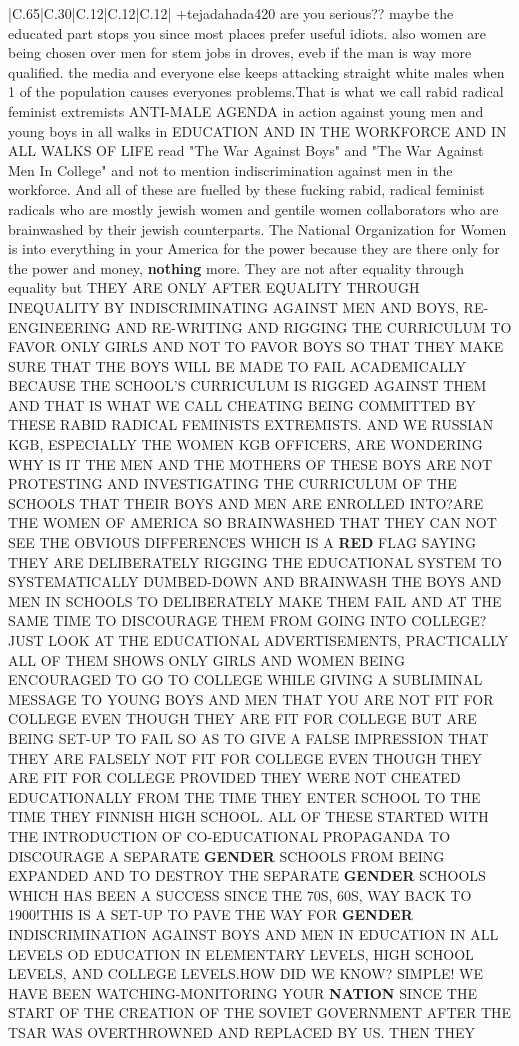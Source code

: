\documentclass[11pt]{article}
\newlength\mylength
\begin{document}
\begin{center}
\begin{longtable}{|C{.65\mylength}|C{.30\mylength}|C{.12\mylength}|C{.12\mylength}|C{.12\mylength}|}
  \small +tejadahada420 are you serious?? maybe the educated part stops you since most places prefer useful idiots. also women are being chosen over men for stem jobs in droves, eveb if the man is way more qualified. the media and everyone else keeps attacking straight white males when 1 of the population causes everyones problems.That is what we call rabid radical feminist extremists ANTI-MALE AGENDA in action against young men and young boys in all walks in EDUCATION AND IN THE WORKFORCE AND IN ALL WALKS OF LIFE read "The War Against Boys" and "The War Against Men In College" and not to mention indiscrimination against men in the workforce. And all of these are fuelled by these fucking rabid, radical feminist radicals who are mostly jewish women and gentile women collaborators who are brainwashed by their jewish counterparts. The National Organization for Women is into everything in your America for the power because they are there only for the power and money, \textbf{nothing} more. They are not after equality through equality but THEY ARE ONLY AFTER EQUALITY THROUGH INEQUALITY BY INDISCRIMINATING AGAINST MEN AND BOYS, RE-ENGINEERING AND RE-WRITING AND RIGGING THE CURRICULUM TO FAVOR ONLY GIRLS  AND NOT TO FAVOR BOYS SO THAT THEY MAKE SURE THAT THE BOYS WILL BE MADE TO FAIL ACADEMICALLY BECAUSE THE SCHOOL'S CURRICULUM IS RIGGED AGAINST THEM AND THAT IS WHAT WE CALL CHEATING BEING COMMITTED BY THESE RABID RADICAL FEMINISTS EXTREMISTS. AND WE RUSSIAN KGB, ESPECIALLY THE WOMEN KGB OFFICERS, ARE WONDERING WHY IS IT THE MEN AND THE MOTHERS OF THESE BOYS ARE NOT PROTESTING AND INVESTIGATING THE CURRICULUM OF THE SCHOOLS THAT THEIR BOYS AND MEN ARE ENROLLED INTO?ARE THE WOMEN OF AMERICA SO BRAINWASHED THAT THEY CAN NOT SEE THE OBVIOUS DIFFERENCES WHICH IS A \textbf{R\textbf{ED}} FLAG SAYING THEY ARE DELIBERATELY RIGGING THE EDUCATIONAL SYSTEM TO SYSTEMATICALLY DUMBED-DOWN AND BRAINWASH THE BOYS AND MEN IN SCHOOLS TO DELIBERATELY MAKE THEM FAIL AND AT THE SAME TIME TO DISCOURAGE THEM FROM GOING INTO COLLEGE? JUST LOOK AT THE EDUCATIONAL ADVERTISEMENTS, PRACTICALLY ALL OF THEM SHOWS ONLY GIRLS AND WOMEN BEING ENCOURAGED TO GO TO COLLEGE WHILE GIVING A SUBLIMINAL MESSAGE TO YOUNG BOYS AND MEN THAT YOU ARE NOT FIT FOR COLLEGE EVEN THOUGH THEY ARE FIT FOR COLLEGE BUT ARE BEING SET-UP TO FAIL SO AS TO GIVE A FALSE IMPRESSION THAT THEY ARE FALSELY NOT FIT FOR COLLEGE EVEN THOUGH THEY ARE FIT FOR COLLEGE PROVIDED THEY WERE NOT CHEATED EDUCATIONALLY FROM THE TIME THEY ENTER SCHOOL TO THE TIME THEY FINNISH HIGH SCHOOL. ALL OF THESE STARTED WITH THE INTRODUCTION OF CO-EDUCATIONAL PROPAGANDA TO DISCOURAGE A SEPARATE \textbf{GENDER} SCHOOLS FROM BEING EXPANDED AND TO DESTROY THE SEPARATE \textbf{GENDER} SCHOOLS WHICH HAS BEEN A SUCCESS SINCE THE 70S, 60S, WAY BACK TO 1900!THIS IS A SET-UP TO PAVE THE WAY FOR \textbf{GENDER} INDISCRIMINATION AGAINST BOYS AND MEN IN EDUCATION IN ALL LEVELS OD EDUCATION IN ELEMENTARY LEVELS, HIGH SCHOOL LEVELS, AND COLLEGE LEVELS.HOW DID WE KNOW? SIMPLE! WE HAVE BEEN WATCHING-MONITORING YOUR \textbf{NATION} SINCE THE START OF THE CREATION OF THE SOVIET GOVERNMENT AFTER THE TSAR WAS OVERTHROWNED AND REPLACED BY US. THEN THEY 
\end{longtable}
\end{center}
\end{document}
